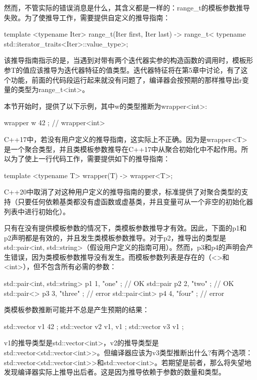 然而，不管实际的错误消息是什么，其含义都是一样的：range\_t的模板参数推导失败。为了使推导工作，需要提供自定义的推导指南：

\begin{cpp}
template <typename Iter>
range_t(Iter first, Iter last) ->
range_t<
typename std::iterator_traits<Iter>::value_type>;
\end{cpp}

该推导指南指示的是，当遇到对带有两个迭代器实参的构造函数的调用时，模板形参T的值应该推导为迭代器特征的值类型。迭代器特征将在第5章中讨论，有了这个功能，前面的代码段运行起来就没有问题了，编译器会按预期的那样推导出r变量的类型为range\_t<int>。

本节开始时，提供了以下示例，其中w的类型推断为wrapper<int>:

\begin{cpp}
wrapper w{ 42 }; // wrapper<int>
\end{cpp}

C++17中，若没有用户定义的推导指南，这实际上不正确。因为是wrapper<T>是一个聚合类型，并且类模板参数推导在C++17中从聚合初始化中不起作用。所以为了使上一行代码工作，需要提供如下的推导指南：

\begin{cpp}
template <typename T>
wrapper(T) -> wrapper<T>;
\end{cpp}

C++20中取消了对这种用户定义的推导指南的要求，标准提供了对聚合类型的支持（只要任何依赖基类都没有虚函数或虚基类，并且变量可从一个非空的初始化器列表中进行初始化）。

只有在没有提供模板参数的情况下，类模板参数推导才有效。因此，下面的p1和p2声明都是有效的，并且发生类模板参数推导。对于p2，推导出的类型是std::pair<int, std::string>（假设用户定义的指南可用）。然而，p3和p4的声明会产生错误，因为类模板参数推导没有发生。而模板参数列表是存在的（<>和<int>），但不包含所有必需的参数：

\begin{cpp}
std::pair<int, std::string> p1{ 1, "one" }; // OK
std::pair p2{ 2, "two" }; // OK
std::pair<> p3{ 3, "three" }; // error
std::pair<int> p4{ 4, "four" }; // error
\end{cpp}

类模板参数推断可能并不总是产生预期的结果：

\begin{cpp}
std::vector v1{ 42 };
std::vector v2{ v1, v1 };
std::vector v3{ v1 };
\end{cpp}

v1的推导类型是std::vector<int>，v2的推导类型是std::vector<std::vector<int>{}>。但编译器应该为v3类型推断出什么?有两个选项：std::vector<std::vector<int>{}>和std::vector<int>。若期望是前者，那么将失望地发现编译器实际上推导出后者。这是因为推导依赖于参数的数量和类型。

